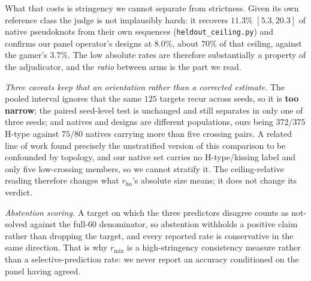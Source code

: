 \documentclass[11pt]{article}
\newcommand{\Siblingline}{A related line of work}
\newcommand{\Siblingline}{A sibling line}
\begin{document}
What that costs is stringency we cannot separate from strictness. Given its own reference class the judge is
not implausibly harsh: it recovers $11.3\%$ $[5.3,20.3]$ of native pseudoknots from their own sequences
(\texttt{heldout\_ceiling.py}) and confirms our panel operator's designs at $8.0\%$, about $70\%$ of that
ceiling, against the gamer's $3.7\%$. The low absolute rates are therefore substantially a property of the
adjudicator, and the \emph{ratio} between arms is the part we read.

\emph{Three caveats keep that an orientation rather than a corrected estimate.} The pooled interval ignores
that the same $125$ targets recur across seeds, so it is \textbf{too narrow}; the paired seed-level test is
unchanged and still separates in only one of three seeds; and natives and designs are different populations,
ours being $372/375$ H-type against $75/80$ natives carrying more than five crossing pairs. \Siblingline{}
found precisely the unstratified version of this comparison to be confounded by topology, and our native set
carries no H-type/kissing label and only five low-crossing members, so we cannot stratify it. The
ceiling-relative reading therefore changes what $r_{\mathrm{ho}}$'s absolute size means; it does not change
its verdict.

\emph{Abstention scoring.} A target on which the three predictors disagree counts as not-solved against the
full-$60$ denominator, so abstention withholds a positive claim rather than dropping the target, and every
reported rate is conservative in the same direction. That is why $r_{\mathrm{mix}}$ is a high-stringency
consistency measure rather than a selective-prediction rate: we never report an accuracy conditioned on the
panel having agreed.
\end{document}
